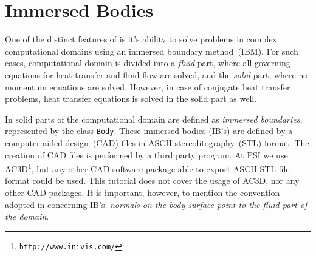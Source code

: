 \section{Immersed Bodies}
\label{sec_boddies}

One of the distinct features of {\psiboil} is it's ability to solve problems in
complex computational domains using an immersed boundary method~(IBM). For such cases, 
computational domain is divided into a {\em fluid} part, where all governing 
equations for heat transfer and fluid flow are solved, and the {\em solid} part, 
where no momentum equations are solved. However, in case of conjugate heat transfer
problems, heat transfer equations is solved in the solid part as well. 

In {\psiboil} solid parts of the computational domain are defined as
{\em immersed boundaries}, represented by the class {\tt Body}. These immersed
bodies (IB's) are defined by a computer aided design~(CAD) files in 
ASCII stereolitography~(STL) format. The creation of CAD files is performed by
a third party program. At PSI we use AC3D\footnote{\tt http://www.inivis.com/}, 
but any other CAD software package able to export ASCII STL file format could be used. 
This tutorial does not cover the usage of AC3D, nor any other CAD packages. It is
important, however, to mention the convention adopted in {\psiboil} concerning
IB's: {\em normals on the body surface point to the fluid part
of the domain}.

